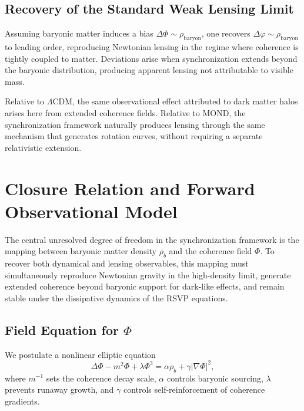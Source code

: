 \documentclass[11pt, a4paper, twocolumn]{article}
\begin{document}
\subsection{Recovery of the Standard Weak Lensing Limit}

Assuming baryonic matter induces a bias $\Delta\Phi \sim \rho_{\mathrm{baryon}}$,
one recovers $\Delta\varphi \sim \rho_{\mathrm{baryon}}$ to leading order,
reproducing Newtonian lensing in the regime where coherence is tightly coupled
to matter. Deviations arise when synchronization extends beyond the baryonic
distribution, producing apparent lensing not attributable to visible mass.

Relative to $\Lambda$CDM, the same observational effect attributed to dark
matter halos arises here from extended coherence fields. Relative to MOND, the
synchronization framework naturally produces lensing through the same mechanism
that generates rotation curves, without requiring a separate relativistic
extension.

\section{Closure Relation and Forward Observational Model}

The central unresolved degree of freedom in the synchronization framework is
the mapping between baryonic matter density $\rho_b$ and the coherence field
$\Phi$. To recover both dynamical and lensing observables, this mapping must
simultaneously reproduce Newtonian gravity in the high-density limit, generate
extended coherence beyond baryonic support for dark-like effects, and remain
stable under the dissipative dynamics of the RSVP equations.

\subsection{Field Equation for $\Phi$}

We postulate a nonlinear elliptic equation
\begin{equation}
\Delta\Phi - m^2\Phi + \lambda\Phi^3
=
\alpha\rho_b + \gamma|\nabla\Phi|^2,
\label{eq:phi_closure}
\end{equation}
where $m^{-1}$ sets the coherence decay scale, $\alpha$ controls baryonic
sourcing, $\lambda$ prevents runaway growth, and $\gamma$ controls
self-reinforcement of coherence gradients.
\end{document}

